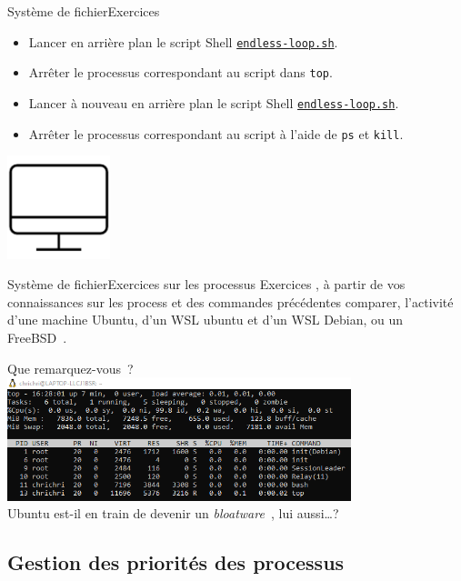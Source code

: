 \documentclass{beamer}
\begin{document}
    \begin{frame}{Système de fichier}{Exercices \execcounterdispinc{}}
        \begin{itemize}
            \item Lancer en arrière plan le script Shell \href{https://github.com/My-Digital-School-by-PapIT/Linux/blob/main/endless-loop.sh}{\lstinline{endless-loop.sh}}.
            \item Arrêter le processus correspondant au script dans \lstinline{top}.
            \item Lancer à nouveau en arrière plan le script Shell \href{https://github.com/My-Digital-School-by-PapIT/Linux/blob/main/endless-loop.sh}{\lstinline{endless-loop.sh}}.
            \item Arrêter le processus correspondant au script à l'aide de  \lstinline{ps} et \lstinline{kill}.
        \end{itemize}
        \bigbreak
        \centering
        \includegraphics[width=3cm]{image/desktop}
    \end{frame}

    \begin{frame}{Système de fichier}{Exercices sur les processus}
        Exercices \execcounterdispinc{}, à partir de vos connaissances sur les process et des commandes précédentes comparer, l'activité d'une machine Ubuntu, d'un WSL ubuntu et d'un WSL Debian, ou un FreeBSD~.

        Que remarquez-vous~?
        \pause
        \bigbreak
        \centering
        \includegraphics[width=10cm]{image/top-debian} \\ Ubuntu est-il en train de devenir un \textit{bloatware~}, lui aussi\ldots {}?
    \end{frame}

    \subsection{Gestion des priorités des processus}\label{subsec:process-priority}
\end{document}
